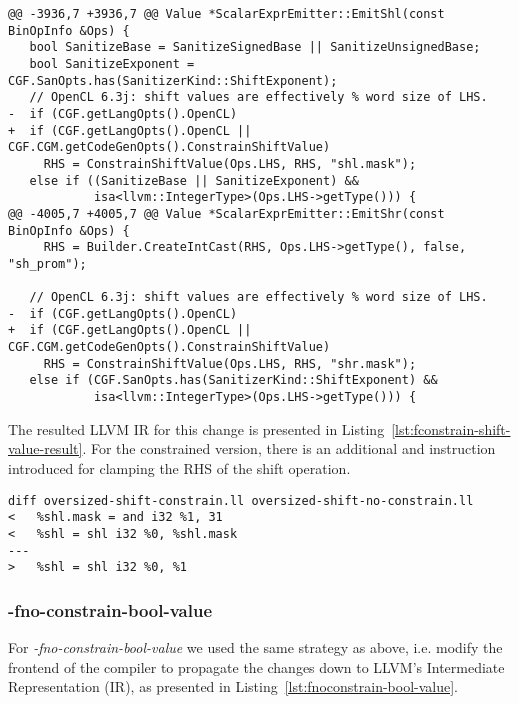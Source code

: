 \begin{lstlisting}[style=Cstyle, caption={-fconstrain-shift-value
implementation}, label={lst:fconstrain-shift-value}]
@@ -3936,7 +3936,7 @@ Value *ScalarExprEmitter::EmitShl(const BinOpInfo &Ops) {
   bool SanitizeBase = SanitizeSignedBase || SanitizeUnsignedBase;
   bool SanitizeExponent = CGF.SanOpts.has(SanitizerKind::ShiftExponent);
   // OpenCL 6.3j: shift values are effectively % word size of LHS.
-  if (CGF.getLangOpts().OpenCL)
+  if (CGF.getLangOpts().OpenCL || CGF.CGM.getCodeGenOpts().ConstrainShiftValue)
     RHS = ConstrainShiftValue(Ops.LHS, RHS, "shl.mask");
   else if ((SanitizeBase || SanitizeExponent) &&
            isa<llvm::IntegerType>(Ops.LHS->getType())) {
@@ -4005,7 +4005,7 @@ Value *ScalarExprEmitter::EmitShr(const BinOpInfo &Ops) {
     RHS = Builder.CreateIntCast(RHS, Ops.LHS->getType(), false, "sh_prom");

   // OpenCL 6.3j: shift values are effectively % word size of LHS.
-  if (CGF.getLangOpts().OpenCL)
+  if (CGF.getLangOpts().OpenCL || CGF.CGM.getCodeGenOpts().ConstrainShiftValue)
     RHS = ConstrainShiftValue(Ops.LHS, RHS, "shr.mask");
   else if (CGF.SanOpts.has(SanitizerKind::ShiftExponent) &&
            isa<llvm::IntegerType>(Ops.LHS->getType())) {
\end{lstlisting}

The resulted LLVM IR for this change is presented in
Listing~\ref{lst:fconstrain-shift-value-result}. For the constrained version,
there is an additional and instruction introduced for clamping the RHS of the
shift operation.

\begin{lstlisting}[style=Cstyle, caption={-fconstrain-shift-value
results}, label={lst:fconstrain-shift-value-result}]
diff oversized-shift-constrain.ll oversized-shift-no-constrain.ll
<   %shl.mask = and i32 %1, 31
<   %shl = shl i32 %0, %shl.mask
---
>   %shl = shl i32 %0, %1
\end{lstlisting}

\subsubsection{-fno-constrain-bool-value}

For \textit{-fno-constrain-bool-value} we used the same strategy as above, i.e.
modify the frontend of the compiler to propagate the changes down to LLVM's
Intermediate Representation (IR), as presented in
Listing~\ref{lst:fnoconstrain-bool-value}.

